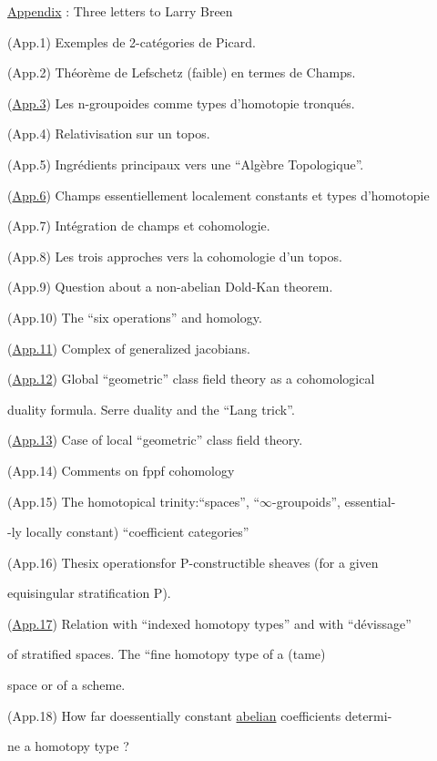 \par
\uline{Appendix} : Three letters to Larry Breen\par

(App.1) Exemples de 2-catégories de Picard.\par
(App.2)  Théorème de Lefschetz (faible) en termes de \hand{(}Champs.\hand{)}\par
(\uline{App.3}) Les n-groupoides comme types d'homotopie tronqués.\par
(App.4) Relativisation sur un topos.\par
(App.5) Ingrédients principaux vers une ``Algèbre Topologique''.\par

\par
(\uline{App.6}) Champs essentiellement localement constants et types d'homoto\hand{(}pie\par
(App.7) Intégration de champs et cohomologie.\par
(App.8) Les trois approches vers la cohomologie d'un topos.\par

\par
(App.9)  Question about a non-abelian Dold-Kan theorem.\par
(App.10) The ``six operations'' and homology.\par
(\uline{App.11}) Complex of generalized jacobians.\par
(\uline{App.12}) Global ``geometric'' class field theory as a cohomological\par
duality formula. Serre duality and the ``Lang trick''.\par
(\uline{App.13}) Case of local ``geometric'' class field theory.\par
(App.14) Comments on fppf cohomology   \par
(App.15) The homotopical trinity:\deleted{\hand{(}}``spaces'', ``$\infty$-groupoids'', \hand{(}essential-\par%
-ly locally constant) ``coefficient categories''\par
(App.16) Thesix operationsfor P-constructible sheaves (for a given\par
equisingular stratification P).\par
(\uline{App.17}) Relation with ``indexed homotopy types'' and with ``dévissage''\par
of stratified spaces. The ``fine homotopy type of a (tame)\par
space or of a scheme.\par
(App.18) How far doessentially constant \uline{abelian} coefficients determi-\par%
ne a homotopy type ?\par

